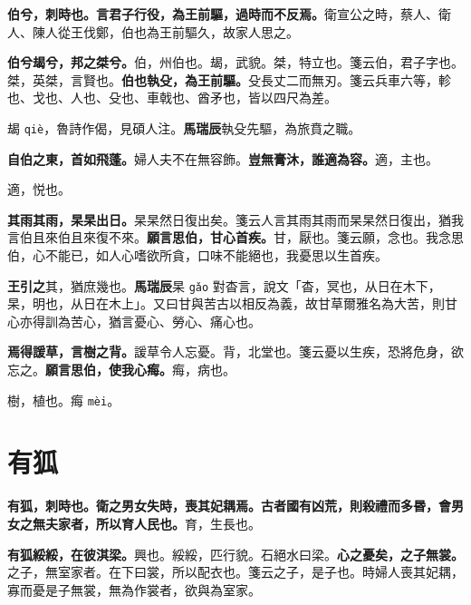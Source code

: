 
\textbf{伯兮，刺時也。言君子行役，為王前驅，過時而不反焉。}{\footnotesize 衛宣公之時，蔡人、衛人、陳人從王伐鄭，伯也為王前驅久，故家人思之。}

\textbf{伯兮朅兮，邦之桀兮。}{\footnotesize 伯，州伯也。朅，武貌。桀，特立也。箋云伯，君子字也。桀，英桀，言賢也。}\textbf{伯也執殳，為王前驅。}{\footnotesize 殳長丈二而無刃。箋云兵車六等，軫也、戈也、人也、殳也、車戟也、酋矛也，皆以四尺為差。}

\begin{quoting}朅 \texttt{qiè}，魯詩作偈，見碩人注。\textbf{馬瑞辰}執殳先驅，為旅賁之職。\end{quoting}

\textbf{自伯之東，首如飛蓬。}{\footnotesize 婦人夫不在無容飾。}\textbf{豈無膏沐，誰適為容。}{\footnotesize 適，主也。}

\begin{quoting}適，悦也。\end{quoting}

\textbf{其雨其雨，杲杲出日。}{\footnotesize 杲杲然日復出矣。箋云人言其雨其雨而杲杲然日復出，猶我言伯且來伯且來復不來。}\textbf{願言思伯，甘心首疾。}{\footnotesize 甘，厭也。箋云願，念也。我念思伯，心不能已，如人心嗜欲所貪，口味不能絕也，我憂思以生首疾。}

\begin{quoting}\textbf{王引之}其，猶庶幾也。\textbf{馬瑞辰}杲 \texttt{gǎo} 對杳言，說文「杳，冥也，从日在木下，杲，明也，从日在木上」。又曰甘與苦古以相反為義，故甘草爾雅名為大苦，則甘心亦得訓為苦心，猶言憂心、勞心、痛心也。\end{quoting}

\textbf{焉得諼草，言樹之背。}{\footnotesize 諼草令人忘憂。背，北堂也。箋云憂以生疾，恐將危身，欲忘之。}\textbf{願言思伯，使我心痗。}{\footnotesize 痗，病也。}

\begin{quoting}樹，植也。痗 \texttt{mèi}。\end{quoting}

\section{有狐}


\textbf{有狐，刺時也。衛之男女失時，喪其妃耦焉。古者國有凶荒，則殺禮而多昬，會男女之無夫家者，所以育人民也。}{\footnotesize 育，生長也。}

\textbf{有狐綏綏，在彼淇梁。}{\footnotesize 興也。綏綏，匹行貌。石絕水曰梁。}\textbf{心之憂矣，之子無裳。}{\footnotesize 之子，無室家者。在下曰裳，所以配衣也。箋云之子，是子也。時婦人喪其妃耦，寡而憂是子無裳，無為作裳者，欲與為室家。}

